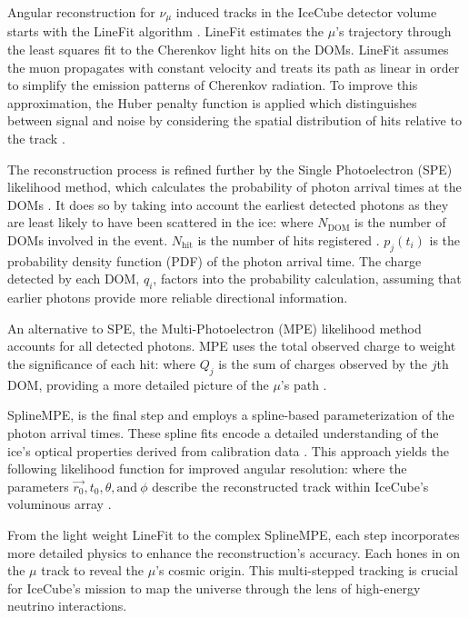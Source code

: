 Angular reconstruction for $\nu_\mu$ induced tracks in the IceCube detector volume starts with the LineFit algorithm \cite{AMANDA_trackreco}.
LineFit estimates the $\mu$'s trajectory through the least squares fit to the Cherenkov light hits on the DOMs.
LineFit assumes the muon propagates with constant velocity and treats its path as linear in order to simplify the emission patterns of Cherenkov radiation.
To improve this approximation, the Huber penalty function \cite{Huber:1964} is applied which distinguishes between signal and noise by considering the spatial distribution of hits relative to the track \cite{IC3_Calibration}.

The reconstruction process is refined further by the Single Photoelectron (SPE) likelihood method, which calculates the probability of photon arrival times at the DOMs \cite{Huber:1964}.
It does so by taking into account the earliest detected photons as they are least likely to have been scattered in the ice:
\spe
where $N_{\mathrm{DOM}}$ is the number of DOMs involved in the event.
$N_{\mathrm{hit}}$ is the number of hits registered \cite{AMANDA_trackreco}.
$p_j(t_i)$ is the probability density function (PDF) of the photon arrival time.
The charge detected by each DOM, $q_i$, factors into the probability calculation, assuming that earlier photons provide more reliable directional information.

An alternative to SPE, the Multi-Photoelectron (MPE) likelihood method accounts for all detected photons.
MPE uses the total observed charge to weight the significance of each hit:
\mpe
where $Q_j$ is the sum of charges observed by the $j$th DOM, providing a more detailed picture of the $\mu$'s path \cite{AMANDA_trackreco}.

SplineMPE, is the final step and employs a spline-based parameterization of the photon arrival times.
These spline fits encode a detailed understanding of the ice's optical properties derived from calibration data \cite{AMANDA_trackreco}.
This approach yields the following likelihood function for improved angular resolution:
\splineMPE
where the parameters $\vec{r_0}, t_0, \theta, \mathrm{ and}~\phi$ describe the reconstructed track within IceCube's voluminous array \cite{AMANDA_trackreco}.

From the light weight LineFit to the complex SplineMPE, each step incorporates more detailed physics to enhance the reconstruction's accuracy.
Each hones in on the $\mu$ track to reveal the $\mu$'s cosmic origin.
This multi-stepped tracking is crucial for IceCube's mission to map the universe through the lens of high-energy neutrino interactions.

